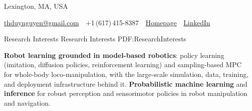 \documentclass[letterpaper,MMMyyyy,nonstopmode]{simpleresumecv}
\newcommand{\CVAuthor}{Duy-Nguyen Ta}
\newcommand{\CVWebpage}{http://thduynguyen.github.io}
\newcommand{\CVLinkedIn}{https://www.linkedin.com/in/duynguyen-ta/}
\begin{document}

\Title{\CVAuthor}

\begin{SubTitle}
Lexington, MA, USA
\par
\href{mailto:thduynguyen@gmail.com}
{thduynguyen@gmail.com}
\,\SubBulletSymbol\,
+1\,(617)\,415-8387
\,\SubBulletSymbol\,
\href{\CVWebpage}
{\url{Homepage}}
\,\SubBulletSymbol\,
\href{\CVLinkedIn}
{\url{LinkedIn}}
\end{SubTitle}

\begin{Body}


\Section
{Research Interests}
{Research Interests}
{PDF:ResearchInterests}

\BulletItem
\textbf{Robot learning grounded in model-based robotics}: policy learning (imitation, diffusion policies, reinforcement learning) and sampling-based MPC for whole-body loco-manipulation, with the large-scale simulation, data, training, and deployment infrastructure behind it.
\BulletItem
\textbf{Probabilistic machine learning} and \textbf{inference} for robust perception and sensorimotor policies in robot manipulation and navigation.



\end{Body}
\end{document}
